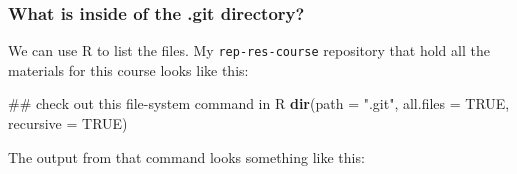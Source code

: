 \documentclass[]{book}
\newenvironment{Shaded}{\begin{snugshade}}{\end{snugshade}}
\newcommand{\KeywordTok}[1]{\textcolor[rgb]{0.13,0.29,0.53}{\textbf{{#1}}}}
\newcommand{\DataTypeTok}[1]{\textcolor[rgb]{0.13,0.29,0.53}{{#1}}}
\newcommand{\StringTok}[1]{\textcolor[rgb]{0.31,0.60,0.02}{{#1}}}
\newcommand{\OtherTok}[1]{\textcolor[rgb]{0.56,0.35,0.01}{{#1}}}
\newcommand{\NormalTok}[1]{{#1}}
\theoremstyle{definition}
\theoremstyle{definition}
\theoremstyle{remark}
\begin{document}
\subsubsection{What is inside of the .git
directory?}\label{what-is-inside-of-the-.git-directory}

We can use R to list the files. My \texttt{rep-res-course} repository
that hold all the materials for this course looks like this:

\begin{Shaded}
\begin{Highlighting}[]
\NormalTok{## check out this file-system command in R}
\KeywordTok{dir}\NormalTok{(}\DataTypeTok{path =} \StringTok{".git"}\NormalTok{, }\DataTypeTok{all.files =} \OtherTok{TRUE}\NormalTok{, }\DataTypeTok{recursive =} \OtherTok{TRUE}\NormalTok{)}
\end{Highlighting}
\end{Shaded}

The output from that command looks something like this:
\end{document}
